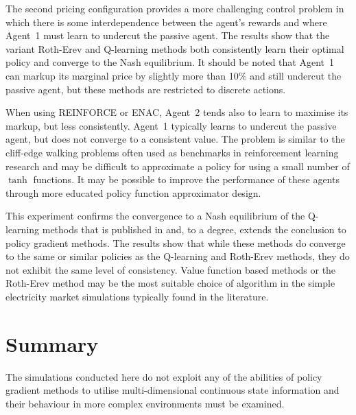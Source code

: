 The second pricing configuration provides a more challenging control problem in
which there is some interdependence between the agent's rewards and where
Agent~1 must learn to undercut the passive agent.  The results show that the
variant Roth-Erev and Q-learning methods both consistently learn their optimal
policy and converge to the Nash equilibrium.  It should be noted that Agent~1
can markup its marginal price by slightly more than 10\% and still undercut
the passive agent, but these methods are restricted to discrete actions.

When using REINFORCE or ENAC, Agent~2 tends also to learn to maximise its
markup, but less consistently.  Agent~1 typically learns to undercut the
passive agent, but does not converge to a consistent value.  The problem is
similar to the cliff-edge walking problems often used as benchmarks in
reinforcement learning research and may be difficult to approximate a policy
for using a small number of $\tanh$ functions. It may be possible to improve
the performance of these agents through more educated policy function
approximator design.

This experiment confirms the convergence to a Nash equilibrium of the
Q-learning methods that is published in  and, to a degree,
extends the conclusion to policy gradient methods.  The results show that
while these methods do converge to the same or similar policies as the
Q-learning and Roth-Erev methods, they do not exhibit the same level of
consistency.  Value function based methods or the Roth-Erev method may be the
most suitable choice of algorithm in the simple electricity market simulations
typically found in the literature.

\section{Summary}
The simulations conducted here do not exploit any of
the abilities of policy gradient methods to utilise multi-dimensional
continuous state information and their behaviour in more complex environments
must be examined.



